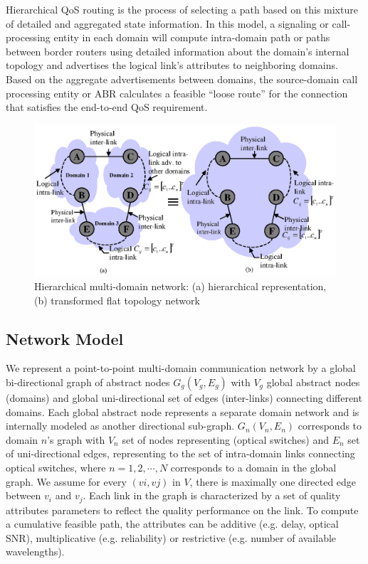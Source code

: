 Hierarchical QoS routing is the process of selecting a path based on this mixture of detailed and aggregated state information. In this model, a signaling or call-processing entity in each domain will compute intra-domain path or paths between border routers using detailed information about the domain's internal topology and advertises the logical link's attributes to neighboring domains. Based on the aggregate advertisements between domains, the source-domain call processing entity or ABR calculates a feasible ``loose route'' for the connection that satisfies the end-to-end QoS requirement.

\begin{figure}[t]
\centering
\includegraphics{Figures/MultiDomainAbstraction.eps}
\caption[Hierarchical multi-domain network]
{Hierarchical multi-domain network:
 (a) hierarchical representation,
 (b) transformed flat topology network
}
\label{fig:MultiDomainAbstraction}
\end{figure}

\subsection{Network Model}
We represent a point-to-point multi-domain communication network by a global bi-directional graph of abstract nodes $G_g(V_g, E_g)$ with $V_g$ global abstract nodes (domains) and \eg global uni-directional set of edges (inter-links) connecting different domains. Each global abstract node represents a separate domain network and is internally modeled as another directional sub-graph. $G_n(V_n, E_n)$ corresponds to domain $n$'s graph with $V_n$ set of nodes representing (optical switches) and $E_n$ set of uni-directional edges, representing to the set of intra-domain links connecting optical switches, where $n=1,2,\cdots,N$ corresponds to a domain in the global graph. We assume for every $(vi, vj)$ in $V$, there is maximally one directed edge between $v_i$ and $v_j$. Each link in the graph is characterized by a set of quality attributes parameters to reflect the quality performance on the link. To compute a cumulative feasible path, the attributes can be additive (e.g. delay, optical SNR), multiplicative (e.g. reliability) or restrictive (e.g. number of available wavelengths).


